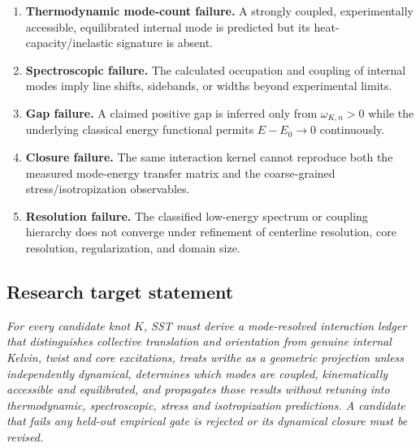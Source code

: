 \begin{enumerate}
    \item \textbf{Thermodynamic mode-count failure.}
    A strongly coupled, experimentally accessible, equilibrated internal mode is
    predicted but its heat-capacity/inelastic signature is absent.

    \item \textbf{Spectroscopic failure.}
    The calculated occupation and coupling of internal modes imply line shifts,
    sidebands, or widths beyond experimental limits.

    \item \textbf{Gap failure.}
    A claimed positive gap is inferred only from $\omega_{K,n}>0$ while the
    underlying classical energy functional permits $E-E_0\to0$ continuously.

    \item \textbf{Closure failure.}
    The same interaction kernel cannot reproduce both the measured mode-energy
    transfer matrix and the coarse-grained stress/isotropization observables.

    \item \textbf{Resolution failure.}
    The classified low-energy spectrum or coupling hierarchy does not converge
    under refinement of centerline resolution, core resolution, regularization,
    and domain size.
\end{enumerate}

\subsection{Research target statement}

\begin{center}
\begin{minipage}{0.92\linewidth}
\itshape
For every candidate knot $K$, SST must derive a mode-resolved interaction
ledger that distinguishes collective translation and orientation from genuine
internal Kelvin, twist and core excitations, treats writhe as a geometric
projection unless independently dynamical, determines which modes are coupled,
kinematically accessible and equilibrated, and propagates those results without
retuning into thermodynamic, spectroscopic, stress and isotropization
predictions.  A candidate that fails any held-out empirical gate is rejected or
its dynamical closure must be revised.
\end{minipage}
\end{center}
